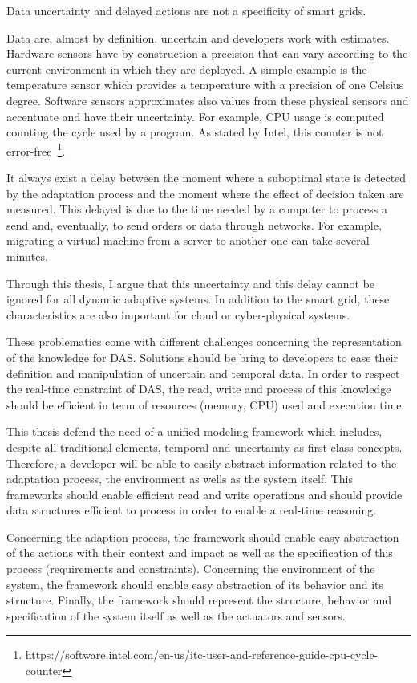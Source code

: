 \bigskip
Data uncertainty and delayed actions are not a specificity of smart grids.

Data are, almost by definition, uncertain and developers work with estimates.
Hardware sensors have by construction a precision that can vary according to the current environment in which they are deployed.
A simple example is the temperature sensor which provides a temperature with a precision of one Celsius degree.
Software sensors approximates also values from these physical sensors and accentuate and have their uncertainty.
For example, CPU usage is computed counting the cycle used by a program.
As stated by Intel, this counter is not error-free~\footnote{https://software.intel.com/en-us/itc-user-and-reference-guide-cpu-cycle-counter}.

It always exist a delay between the moment where a suboptimal state is detected by the adaptation process and the moment where the effect of decision taken are measured.
This delayed is due to the time needed by a computer to process a send and, eventually, to send orders or data through networks.
For example, migrating a virtual machine from a server to another one can take several minutes.

Through this thesis, I argue that this uncertainty and this delay cannot be ignored for all dynamic adaptive systems.
In addition to the smart grid, these characteristics are also important for cloud or cyber-physical systems.

\bigskip
These problematics come with different challenges concerning the representation of the knowledge for DAS.
Solutions should be bring to developers to ease their definition and manipulation of uncertain and temporal data.
In order to respect the real-time constraint of DAS, the read, write and process of this knowledge should be efficient in term of resources (memory, CPU) used and execution time.

\bigskip
This thesis defend the need of a unified modeling framework which includes, despite all traditional elements, temporal and uncertainty as first-class concepts.
Therefore, a developer will be able to easily abstract information related to the adaptation process, the environment as wells as the system itself.
This frameworks should enable efficient read and write operations and should provide data structures efficient to process in order to enable a real-time reasoning.

Concerning the adaption process, the framework should enable easy abstraction of the actions with their context and impact as well as the specification of this process (requirements and constraints).
Concerning the environment of the system, the framework should enable easy abstraction of its behavior and its structure.
Finally, the framework should represent the structure, behavior and specification of the system itself as well as the actuators and sensors.

